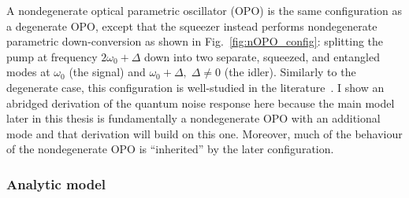 A nondegenerate optical parametric oscillator (OPO) is the same configuration as a degenerate OPO, except that the squeezer instead performs nondegenerate parametric down-conversion as shown in Fig.~\ref{fig:nOPO_config}: splitting the pump at frequency $2\omega_0+\Delta$ down into two separate, squeezed, and entangled modes at $\omega_0$ (the signal) and $\omega_0+\Delta,\; \Delta\neq0$ (the idler). Similarly to the degenerate case, this configuration is well-studied in the literature~\cite{}. I show an abridged derivation of the quantum noise response here because the main model later in this thesis is fundamentally a nondegenerate OPO with an additional mode and that derivation will build on this one. Moreover, much of the behaviour of the nondegenerate OPO is ``inherited'' by the later configuration.

\subsubsection{Analytic model}

